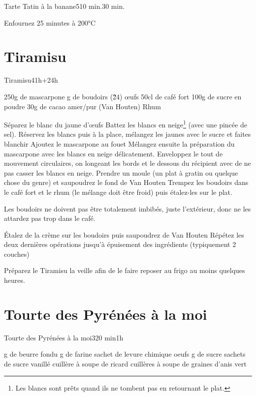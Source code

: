 {\begin{recette}{Tarte Tatin à la banane}{5}{10 min.}{30 min.}
\begin{cuisson}
Enfournez 25 minutes à 200°C
\end{cuisson}
\end{recette}

\section{Tiramisu}
\begin{recette}{Tiramisu}{4}{1h+24h}{}
\begin{ingredients}
\ingredient 250g de mascarpone
 g de boudoirs (\~ 24)
 œufs
\ingredient 50cl de café fort
\ingredient 100g de sucre en poudre
\ingredient 30g de cacao amer/pur (Van Houten)
\ingredient Rhum
\end{ingredients}

\begin{preparation}
\etape Séparez le blanc du jaune d'œufs
\etape Battez les blancs en neige\footnote{Les 
blancs sont prêts quand ils ne tombent pas en retournant le plat.} (avec une pincée de sel).
\etape Réservez les blancs puis à la place, mélangez les jaunes avec le sucre et faites blanchir
\etape Ajoutez le mascarpone au fouet
\etape Mélangez ensuite la préparation du mascarpone avec les blancs en neige délicatement. Enveloppez le tout de mouvement 
circulaires, on longeant les bords et le dessous du récipient avec de ne pas casser les blancs en neige.
\etape Prendre un moule (un plat à gratin ou quelque chose du genre) et saupoudrez le fond de Van Houten
\etape Trempez les boudoirs dans le café fort et le rhum (le mélange doit être froid) puis étalez-les sur le plat.
\begin{remarque}
Les boudoirs ne doivent pas être totalement imbibés, juste l'extérieur, donc ne les attardez pas trop dans le café.
\end{remarque}
\etape Étalez de la crème sur les boudoirs puis saupoudrez de Van Houten
\etape Répétez les deux dernières opérations jusqu'à épuisement des ingrédients (typiquement 2 couches)
\end{preparation}

\begin{remarque}
Préparez le Tiramisu la veille afin de le faire reposer au frigo au moins quelques heures.
\end{remarque}
\end{recette}

\section{Tourte des Pyrénées à la moi}
\begin{recette}{Tourte des Pyrénées à la moi}{3}{20 min}{1h}
\begin{ingredients}
 g de beurre fondu
 g de farine
 sachet de levure chimique
 oeufs
 g de sucre
 sachets de sucre vanillé
 cuillère à soupe de ricard
 cuillères à soupe de graines d'anis vert
\end{ingredients}


\end{recette}}
